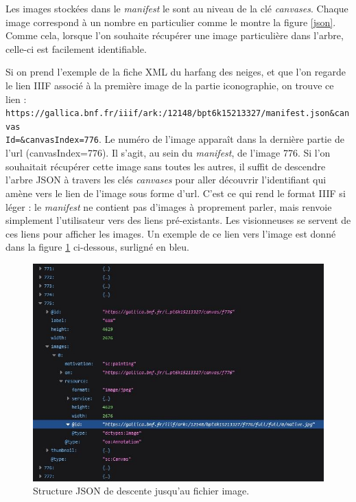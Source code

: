 \documentclass[a4paper,12pt,twoside]{book}
\begin{document}
Les images stockées dans le \textit{manifest} le sont au niveau de la clé \textit{canvases}. Chaque image correspond à un nombre en particulier comme le montre la figure \ref{json}. Comme cela, lorsque l'on souhaite récupérer une image particulière dans l'arbre, celle-ci est facilement identifiable.

Si on prend l'exemple de la fiche XML du harfang des neiges, et que l'on regarde le lien \acrshort{IIIF} associé à la première image de la partie iconographie, on trouve ce lien :\\ \texttt{https://gallica.bnf.fr/iiif/ark:/12148/bpt6k15213327/manifest.json\&canvas\\Id=\&canvasIndex=776}. Le numéro de l'image apparaît dans la dernière partie de l'url (canvasIndex=776). Il s'agit, au sein du \textit{manifest}, de l'image 776. Si l'on souhaitait récupérer cette image sans toutes les autres, il suffit de descendre l'arbre JSON à travers les clés \textit{canvases} pour aller découvrir l'identifiant qui amène vers le lien de l'image sous forme d'url. C'est ce qui rend le format \acrshort{IIIF} si léger : le \textit{manifest} ne contient pas d'images à proprement parler, mais renvoie simplement l'utilisateur vers des liens pré-existants. Les visionneuses se servent de ces liens pour afficher les images. Un exemple de ce lien vers l'image est donné dans la figure \ref{harfang} ci-dessous, surligné en bleu.

\begin{figure}[H]
    \centering
    \includegraphics[width=13cm]{img/partie_3/harfang.JPG}
    \caption{Structure JSON de descente jusqu'au fichier image.}
    \label{harfang}
\end{figure}
\end{document}
